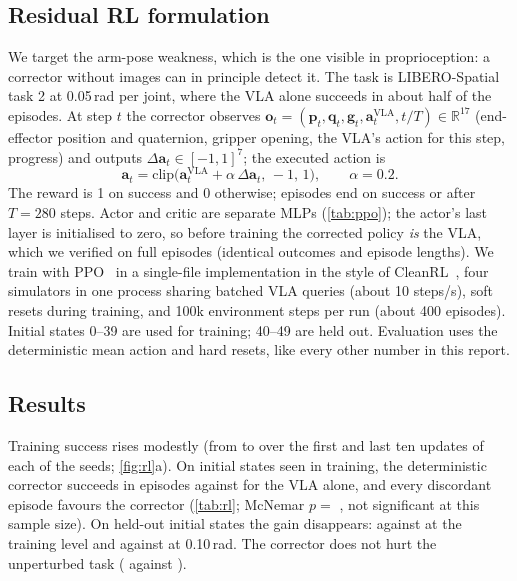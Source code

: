 \documentclass[10pt,twocolumn,letterpaper]{article}
\begin{document}
\subsection{Residual RL formulation}
We target the arm-pose weakness, which is the one visible in proprioception: a corrector without images
can in principle detect it. The task is LIBERO-Spatial task 2 at 0.05\,rad per joint, where the VLA alone
succeeds in about half of the episodes. At step $t$ the corrector observes
$\bm o_t=(\bm p_t,\bm q_t,\bm g_t,\bm a^{\mathrm{VLA}}_t,t/T)\in\mathbb{R}^{17}$ (end-effector position and
quaternion, gripper opening, the VLA's action for this step, progress) and outputs
$\Delta\bm a_t\in[-1,1]^7$; the executed action is
\begin{equation}
  \bm a_t=\mathrm{clip}\big(\bm a^{\mathrm{VLA}}_t+\alpha\,\Delta\bm a_t,\,-1,\,1\big),\qquad \alpha=0.2 .
\end{equation}
The reward is 1 on success and 0 otherwise; episodes end on success or after $T=280$ steps. Actor and critic
are separate MLPs (\cref{tab:ppo}); the actor's last layer is initialised to zero, so before training the
corrected policy \emph{is} the VLA, which we verified on full episodes (identical outcomes and episode
lengths). We train with PPO~\citep{schulman2017ppo} in a single-file implementation in the style of
CleanRL~\citep{huang2022cleanrl}, four simulators in one process sharing batched VLA queries (about 10
steps/s), soft resets during training, and 100k environment steps per run (about 400 episodes). Initial
states 0--39 are used for training; 40--49 are held out. Evaluation uses the deterministic mean action and
hard resets, like every other number in this report.



\begin{table}[t]
\centering
\caption{\textbf{Residual RL evaluation} (successes / episodes, offset in rad per joint). ``Re-plan / 10''
executes 10 instead of 50 actions per chunk, without any learning.}
\label{tab:rl}
\scriptsize
\setlength{\tabcolsep}{3pt}
\resizebox{\columnwidth}{!}{}
\end{table}

\subsection{Results}
Training success rises modestly (from \RLTrainFirst{} to \RLTrainLast{} over the first and last ten updates
of each of the \SeedsWord{} seeds; \cref{fig:rl}a). On initial states seen in training, the deterministic
corrector succeeds in \RLSeenRes{} episodes against \RLSeenVla{} for the VLA alone, and every discordant
episode favours the corrector (\cref{tab:rl}; McNemar $p=$ \RLPSeen{}, not significant at this sample
size). On held-out initial states the gain disappears: \RLUnseenRes{} against \RLUnseenVla{} at the training
level and \RLUnseenStrongRes{} against \RLUnseenStrongVla{} at 0.10\,rad. The corrector does not hurt the
unperturbed task (\RLUnseenCleanRes{} against \RLUnseenCleanVla{}).
\end{document}
